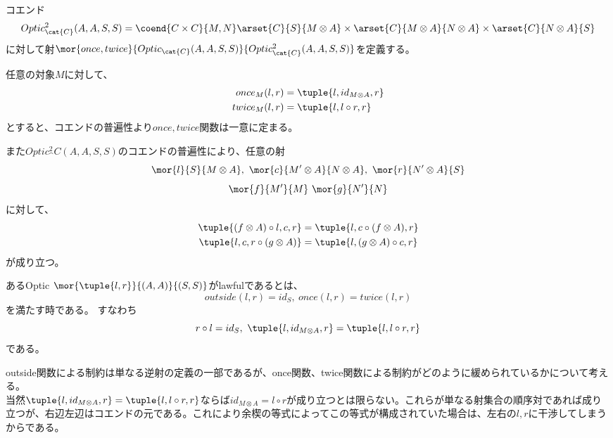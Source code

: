 \documentclass[uplatex,dvipdfmx]{jsarticle}
\begin{document}
  \begin{define}
    コエンド\[Optic^2_\cat{C}(A,A,S,S)=\coend{C\times C}{M,N}\arset{C}{S}{M\otimes A}\times\arset{C}{M\otimes A}{N\otimes A}\times\arset{C}{N\otimes A}{S}\]
    に対して射$\mor{once,twice}{Optic_\cat{C}(A,A,S,S)}{Optic^2_\cat{C}(A,A,S,S)}$を定義する。

    任意の対象$M$に対して、
    \begin{align*}
      once_M(l,r) &= \tuple{l,id_{M\otimes A},r}\\
      twice_M(l,r) &= \tuple{l,l\circ r,r}
    \end{align*}
    とすると、コエンドの普遍性より$once,twice$関数は一意に定まる。
  \end{define}
  また$Optic^2_\cat{C}(A,A,S,S)$のコエンドの普遍性により、任意の射\[\mor{l}{S}{M\otimes A},\ \mor{c}{M'\otimes A}{N\otimes A},\ \mor{r}{N'\otimes A}{S}\]\[\mor{f}{M'}{M}\ \mor{g}{N'}{N}\]に対して、
  \begin{align*}
    \tuple{(f\otimes A)\circ l,c,r}&=\tuple{l,c\circ(f\otimes A),r}\\
    \tuple{l,c,r\circ(g\otimes A)} &= \tuple{l,(g\otimes A)\circ c,r}
  \end{align*}
  が成り立つ。
  \begin{define}[lawful性]
    あるOptic $\mor{\tuple{l,r}}{(A,A)}{(S,S)}$がlawfulであるとは、
    \[outside(l,r)=id_S,\ once(l,r)=twice(l,r)\]を満たす時である。
    すなわち\[r\circ l = id_S,\ \tuple{l,id_{M\otimes A},r}=\tuple{l,l\circ r,r}\]である。
  \end{define}
  outside関数による制約は単なる逆射の定義の一部であるが、once関数、twice関数による制約がどのように緩められているかについて考える。\\

  当然$\tuple{l,id_{M\otimes A},r}=\tuple{l,l\circ r,r}$ならば$id_{M\otimes A}=l\circ r$が成り立つとは限らない。これらが単なる射集合の順序対であれば成り立つが、右辺左辺はコエンドの元である。これにより余楔の等式によってこの等式が構成されていた場合は、左右の$l,r$に干渉してしまうからである。

  

\end{document}
